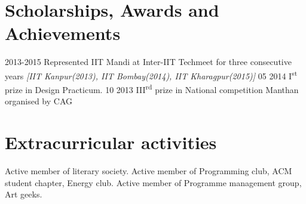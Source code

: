 \documentclass[]{friggeri-cv}
\begin{document}
\section{Scholarships, Awards and Achievements}

\begin{entrylist}
  \awardentry
   	{2013-2015}
   	{Represented IIT Mandi at Inter-IIT Techmeet for three consecutive years \emph{[IIT Kanpur(2013), IIT Bombay(2014), IIT Kharagpur(2015)]}}
  \awardentry
  	{05 2014}
  	{I\textsuperscript{st} prize in Design Practicum.}
  \awardentry
  	{10 2013}
  	{III\textsuperscript{rd} prize in National competition Manthan organised by CAG}
\end{entrylist}

\section{Extracurricular activities}
\begin{entrylist}
  \responsibilityentry
  	{}
  	{Active member of literary society.}
  \responsibilityentry
  	{}
  	{Active member of Programming club, ACM student chapter, Energy club.}
  \responsibilityentry
  	{}
  	{Active member of Programme management group, Art geeks.}
\end{entrylist}




\end{document}
